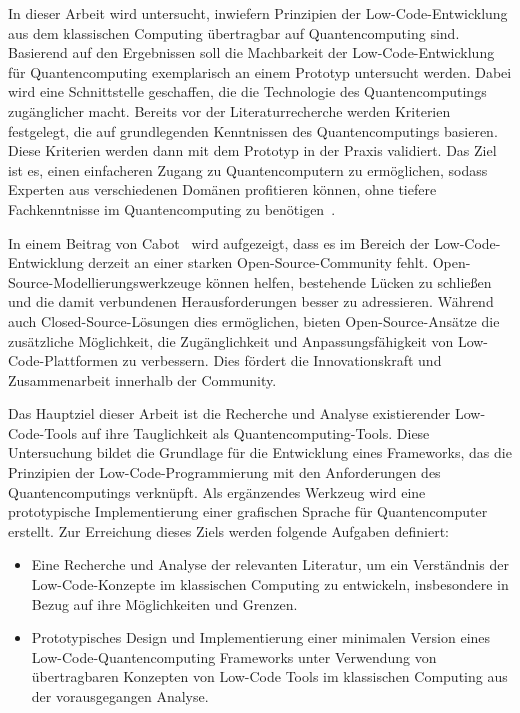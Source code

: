 In dieser Arbeit wird untersucht, inwiefern Prinzipien der Low-Code-Entwicklung aus dem
klassischen Computing übertragbar auf Quantencomputing sind. Basierend auf den Ergebnissen 
soll die Machbarkeit der Low-Code-Entwicklung für Quantencomputing exemplarisch an 
einem Prototyp untersucht werden. Dabei wird eine Schnittstelle geschaffen, die die 
Technologie des Quantencomputings zugänglicher macht. Bereits vor der Literaturrecherche 
werden Kriterien festgelegt, die auf grundlegenden Kenntnissen des Quantencomputings 
basieren. Diese Kriterien werden dann mit dem Prototyp in der Praxis validiert. Das 
Ziel ist es, einen einfacheren Zugang zu Quantencomputern zu ermöglichen, sodass 
Experten aus verschiedenen Domänen profitieren können, ohne tiefere Fachkenntnisse 
im Quantencomputing zu benötigen~\cite{Motta2022}.

In einem Beitrag von Cabot~\cite{Cabot_2020} wird aufgezeigt, dass es im Bereich der 
Low-Code-Entwicklung derzeit an einer starken Open-Source-Community fehlt. 
Open-Source-Modellierungswerkzeuge können helfen, bestehende Lücken zu schließen 
und die damit verbundenen Herausforderungen besser zu adressieren. Während auch 
Closed-Source-Lösungen dies ermöglichen, bieten Open-Source-Ansätze die zusätzliche 
Möglichkeit, die Zugänglichkeit und Anpassungsfähigkeit von Low-Code-Plattformen zu verbessern. 
Dies fördert die Innovationskraft und Zusammenarbeit innerhalb der Community.

Das Hauptziel dieser Arbeit ist die Recherche und Analyse existierender Low-Code-Tools 
auf ihre Tauglichkeit als Quantencomputing-Tools. Diese Untersuchung bildet die Grundlage 
für die Entwicklung eines Frameworks, das die Prinzipien der Low-Code-Programmierung 
mit den Anforderungen des Quantencomputings verknüpft. Als ergänzendes Werkzeug wird 
eine prototypische Implementierung einer grafischen Sprache für Quantencomputer erstellt. 
Zur Erreichung dieses Ziels werden folgende Aufgaben definiert:

\begin{itemize}
\item
  Eine Recherche und Analyse der relevanten Literatur, um ein
  Verständnis der Low-Code-Konzepte im klassischen Computing zu
  entwickeln, insbesondere in Bezug auf ihre Möglichkeiten und Grenzen.
\item
  Prototypisches Design und Implementierung einer minimalen Version
  eines Low-Code-Quantencomputing Frameworks unter Verwendung von
  übertragbaren Konzepten von Low-Code Tools im klassischen Computing
  aus der vorausgegangen Analyse.
\end{itemize}

